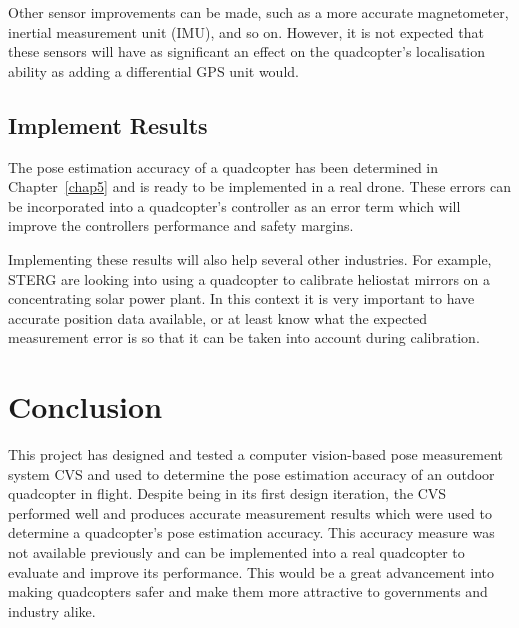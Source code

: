 Other sensor improvements can be made, such as a more accurate magnetometer, inertial measurement unit (IMU), and so on. However, it is not expected that these sensors will have as significant an effect on the quadcopter's localisation ability as adding a differential GPS unit would. 

\subsection{Implement Results}

The pose estimation accuracy of a quadcopter has been determined in Chapter~\ref{chap5} and is ready to be implemented in a real drone. These errors can be incorporated into a quadcopter's controller as an error term which will improve the controllers performance and safety margins. 

Implementing these results will also help several other industries. For example, STERG are looking into using a quadcopter to calibrate heliostat mirrors on a concentrating solar power plant. In this context it is very important to have accurate position data available, or at least know what the expected measurement error is so that it can be taken into account during calibration. 



\section{Conclusion}

This project has designed and tested a computer vision-based pose measurement system CVS and used to determine the pose estimation accuracy of an outdoor quadcopter in flight. Despite being in its first design iteration, the CVS performed well and produces accurate measurement results which were used to determine a quadcopter's pose estimation accuracy. This accuracy measure was not available previously and can be implemented into a real quadcopter to evaluate and improve its performance. This would be a great advancement into making quadcopters safer and make them more attractive to governments and industry alike. 

